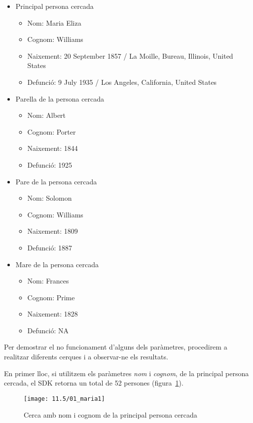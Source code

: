 \begin{itemize}
    \item Principal persona cercada
    \begin{itemize}
        \item Nom: Maria Eliza
        \item Cognom: Williams
        \item Naixement: 20 September 1857 / La Moille, Bureau, Illinois, United States
        \item Defunció: 9 July 1935 / Los Angeles, California, United States
    \end{itemize}
    \item Parella de la persona cercada
    \begin{itemize}
        \item Nom: Albert
        \item Cognom: Porter
        \item Naixement: 1844
        \item Defunció: 1925
    \end{itemize}
    \item Pare de la persona cercada
    \begin{itemize}
        \item Nom: Solomon
        \item Cognom: Williams
        \item Naixement: 1809
        \item Defunció: 1887
    \end{itemize}
    \item Mare de la persona cercada
    \begin{itemize}
        \item Nom: Frances
        \item Cognom: Prime
        \item Naixement: 1828
        \item Defunció: NA
    \end{itemize}
\end{itemize}

Per demostrar el no funcionament d'alguns dels paràmetres, procedirem a rea\-lit\-zar diferents cerques i a observar-ne els resultats.

En primer lloc, si utilitzem els paràmetres \emph{nom} i \emph{cognom}, de la principal persona cercada, el SDK retorna un total de 52 persones (figura~\ref{fig:maria1}).

\begin{figure}[h]
    \texttt{[image: 11.5/01\_maria1]}
    \centering
    \caption{Cerca amb nom i cognom de la principal persona cercada}\label{fig:maria1}
\end{figure}


